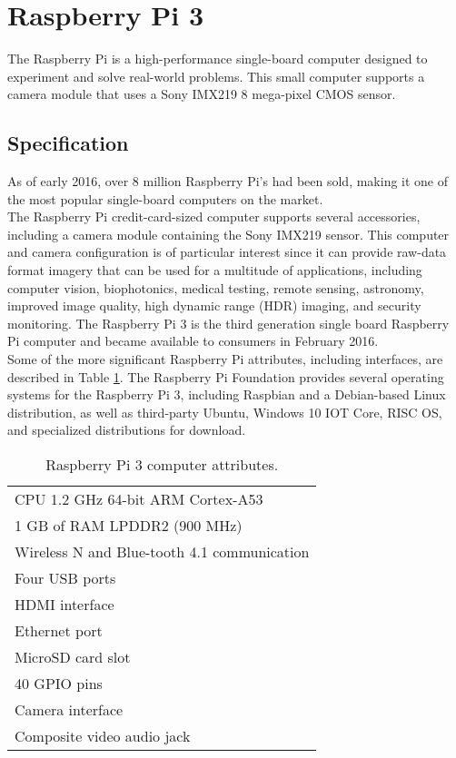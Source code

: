 \section{Raspberry Pi 3}
\label{sec:raspi3}
The Raspberry Pi is a high-performance single-board computer designed to
experiment and solve real-world problems. This small computer supports a camera
module that uses a Sony IMX219 8 mega-pixel CMOS sensor.
%
\subsection{Specification}
\label{ssec:raspispecification}
As of early 2016, over 8 million Raspberry Pi's had been sold, making it one of
the most popular single-board computers on the
market.\cite{upton2016raspberry}\\ The Raspberry Pi credit-card-sized computer
supports several accessories, including a camera module containing the Sony
IMX219 sensor. This computer and camera configuration is of particular interest
since it can provide raw-data format imagery that can be used for a multitude of
applications, including computer vision, biophotonics, medical testing, remote
sensing, astronomy, improved image quality, high dynamic range (HDR) imaging,
and security monitoring. The Raspberry Pi 3 is the third generation single board
Raspberry Pi computer and became available to consumers in February 2016. \\Some
of the more significant Raspberry Pi attributes, including interfaces, are
described in Table \ref{tab:rapberryattributes}. The Raspberry
Pi Foundation provides several operating systems for the  Raspberry Pi 3,
including Raspbian and a Debian-based Linux distribution, as  well as
third-party Ubuntu, Windows 10 IOT Core, RISC OS, and specialized  distributions
for download.\cite{10.1117/1.JEI.26.1.013014}
%
\begin{table}[htb]
\centering
	\caption{Raspberry Pi 3 computer attributes.}
	\label{tab:rapberryattributes}
	\begin{tabular}{l}
		\hline
		CPU 1.2 \si{\giga\hertz} 64-bit ARM Cortex-A53 \\
		1 GB of RAM LPDDR2 (900 \si{\mega\hertz}) \\
		Wireless N and Blue-tooth 4.1 communication\\
		Four USB ports\\
		HDMI interface\\
		Ethernet port\\
		MicroSD card slot\\
		40 GPIO pins\\
		Camera interface\\
		Composite video audio jack\\
		\hline
\end{tabular}
\end{table}
%
